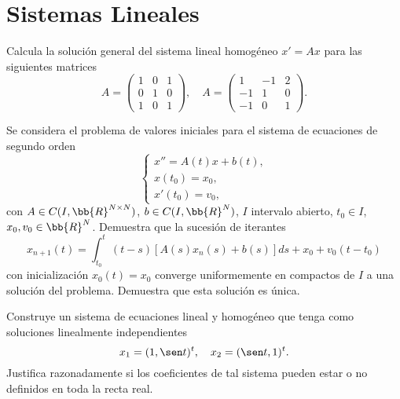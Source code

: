 \section{Sistemas Lineales}

\begin{ejercicio}\label{ej:5.1}
    Calcula la solución general del sistema lineal homogéneo $x' = Ax$ para las siguientes matrices
    \[
        A =
        \begin{pmatrix}
            1 & 0 & 1 \\
            0 & 1 & 0 \\
            1 & 0 & 1
        \end{pmatrix},
        \quad
        A =
        \begin{pmatrix}
            1 & -1 & 2 \\
            -1 & 1 & 0 \\
            -1 & 0 & 1
        \end{pmatrix}.
    \]
\end{ejercicio}

\begin{ejercicio}\label{ej:5.2}
    Se considera el problema de valores iniciales para el sistema de ecuaciones de segundo orden
    \[
        \begin{cases}
            x'' = A(t)x + b(t),\\
            x(t_0) = x_0,\\
            x'(t_0) = v_0,
        \end{cases}
    \]
    con $A \in C(I, \bb{R}^{N\times N})$, $b \in C(I, \bb{R}^N)$, $I$ intervalo abierto, $t_0 \in I$, $x_0, v_0 \in \bb{R}^N$. Demuestra que la sucesión de iterantes
    \[
        x_{n+1}(t) = \int_{t_0}^t (t - s)[A(s)x_n(s) + b(s)]ds + x_0 + v_0(t - t_0)
    \]
    con inicialización $x_0(t) = x_0$ converge uniformemente en compactos de $I$ a una solución del problema. Demuestra que esta solución es única.
\end{ejercicio}

\begin{ejercicio}\label{ej:5.3}
    Construye un sistema de ecuaciones lineal y homogéneo que tenga como soluciones linealmente independientes
    \[
        x_1 = (1, \sen t)^t, \quad x_2 = (\sen t, 1)^t.
    \]
    Justifica razonadamente si los coeficientes de tal sistema pueden estar o no definidos en toda la recta real.
\end{ejercicio}

